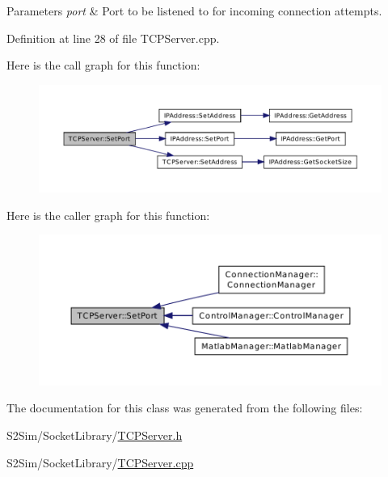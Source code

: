 \begin{DoxyParams}{Parameters}
{\em port} & Port to be listened to for incoming connection attempts. \\
\hline
\end{DoxyParams}


Definition at line 28 of file T\-C\-P\-Server.\-cpp.



Here is the call graph for this function\-:\nopagebreak
\begin{figure}[H]
\begin{center}
\leavevmode
\includegraphics[width=350pt]{class_t_c_p_server_a8d5ad30ba42960a84973b57f74a853fa_cgraph}
\end{center}
\end{figure}




Here is the caller graph for this function\-:\nopagebreak
\begin{figure}[H]
\begin{center}
\leavevmode
\includegraphics[width=350pt]{class_t_c_p_server_a8d5ad30ba42960a84973b57f74a853fa_icgraph}
\end{center}
\end{figure}




The documentation for this class was generated from the following files\-:\begin{DoxyCompactItemize}
\item 
S2\-Sim/\-Socket\-Library/\hyperlink{_t_c_p_server_8h}{T\-C\-P\-Server.\-h}\item 
S2\-Sim/\-Socket\-Library/\hyperlink{_t_c_p_server_8cpp}{T\-C\-P\-Server.\-cpp}\end{DoxyCompactItemize}
